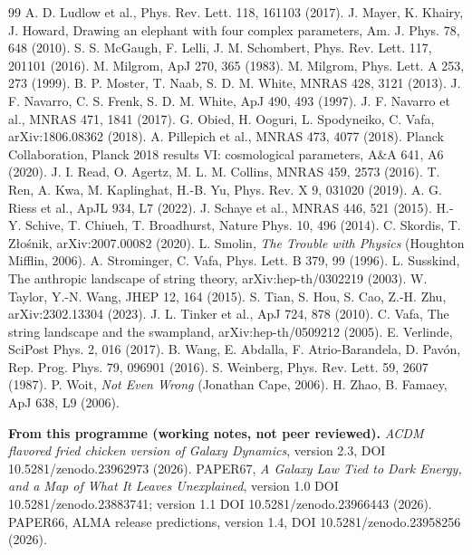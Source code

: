 \begin{thebibliography}{99}
 A. D. Ludlow et al., Phys. Rev. Lett. 118, 161103 (2017).
 J. Mayer, K. Khairy, J. Howard, Drawing an elephant with four complex parameters, Am. J. Phys. 78, 648 (2010).
 S. S. McGaugh, F. Lelli, J. M. Schombert, Phys. Rev. Lett. 117, 201101 (2016).
 M. Milgrom, ApJ 270, 365 (1983).
 M. Milgrom, Phys. Lett. A 253, 273 (1999).
 B. P. Moster, T. Naab, S. D. M. White, MNRAS 428, 3121 (2013).
 J. F. Navarro, C. S. Frenk, S. D. M. White, ApJ 490, 493 (1997).
 J. F. Navarro et al., MNRAS 471, 1841 (2017).
 G. Obied, H. Ooguri, L. Spodyneiko, C. Vafa, arXiv:1806.08362 (2018).
 A. Pillepich et al., MNRAS 473, 4077 (2018).
 Planck Collaboration, Planck 2018 results VI: cosmological parameters, A\&A 641, A6 (2020).
 J. I. Read, O. Agertz, M. L. M. Collins, MNRAS 459, 2573 (2016).
 T. Ren, A. Kwa, M. Kaplinghat, H.-B. Yu, Phys. Rev. X 9, 031020 (2019).
 A. G. Riess et al., ApJL 934, L7 (2022).
 J. Schaye et al., MNRAS 446, 521 (2015).
 H.-Y. Schive, T. Chiueh, T. Broadhurst, Nature Phys. 10, 496 (2014).
 C. Skordis, T. Z\l{}o\'snik, arXiv:2007.00082 (2020).
 L. Smolin, \emph{The Trouble with Physics} (Houghton Mifflin, 2006).
 A. Strominger, C. Vafa, Phys. Lett. B 379, 99 (1996).
 L. Susskind, The anthropic landscape of string theory, arXiv:hep-th/0302219 (2003).
 W. Taylor, Y.-N. Wang, JHEP 12, 164 (2015).
 S. Tian, S. Hou, S. Cao, Z.-H. Zhu, arXiv:2302.13304 (2023).
 J. L. Tinker et al., ApJ 724, 878 (2010).
 C. Vafa, The string landscape and the swampland, arXiv:hep-th/0509212 (2005).
 E. Verlinde, SciPost Phys. 2, 016 (2017).
 B. Wang, E. Abdalla, F. Atrio-Barandela, D. Pav\'on, Rep. Prog. Phys. 79, 096901 (2016).
 S. Weinberg, Phys. Rev. Lett. 59, 2607 (1987).
 P. Woit, \emph{Not Even Wrong} (Jonathan Cape, 2006).
 H. Zhao, B. Famaey, ApJ 638, L9 (2006).

\medskip
\noindent\textbf{From this programme (working notes, not peer reviewed).}
 \emph{ACDM flavored fried chicken version of Galaxy Dynamics}, version 2.3, DOI 10.5281/zenodo.23962973 (2026).
 PAPER67, \emph{A Galaxy Law Tied to Dark Energy, and a Map of What It Leaves Unexplained}, version 1.0 DOI 10.5281/zenodo.23883741; version 1.1 DOI 10.5281/zenodo.23966443 (2026).
 PAPER66, ALMA release predictions, version 1.4, DOI 10.5281/zenodo.23958256 (2026).
\end{thebibliography}
